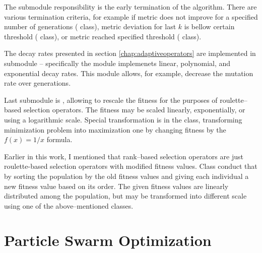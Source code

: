 The  submodule responsibility is the early termination of the algorithm. There are various termination criteria, for example if metric does not improve for a specified number of generations ( class), metric deviation for last $k$ is bellow certain threshold ( class), or metric reached specified threshold ( class).

The decay rates presented in section \ref{chap:adaptiveoperators} are implemented in submodule  -- specifically the module implemenets linear, polynomial, and exponential decay rates. This module allows, for example, decrease the mutation rate over generations.

Last submodule is , allowing to rescale the fitness for the purposes of roulette--based selection operators. The fitness may be scaled linearly, exponentially, or using a logarithmic scale. Special transformation is in the  class, transforming minimization problem into maximization one by changing fitness by the $f(x)=1/x$ formula.

Earlier in this work, I mentioned that rank--based selection operators are just roulette-based selection operators with modified fitness values. Class  conduct that by sorting the population by the old fitness values and giving each individual a new fitness value based on its order. The given fitness values are linearly distributed among the population, but may be transformed into different scale using one of the above--mentioned classes.




\section{Particle Swarm Optimization}

